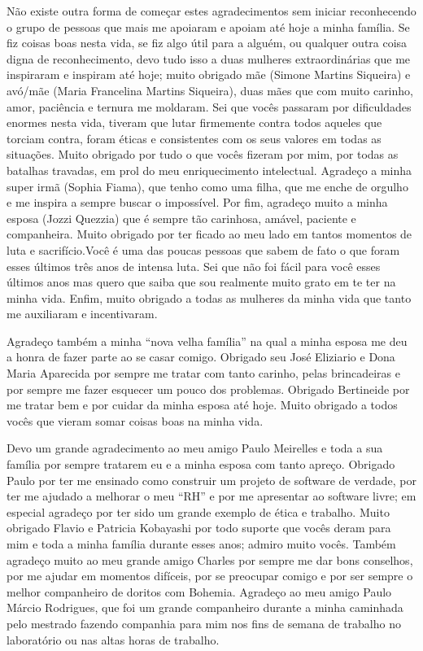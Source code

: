 Não existe outra forma de começar estes agradecimentos sem iniciar reconhecendo
o grupo de pessoas que mais me apoiaram e apoiam até hoje a minha família. Se
fiz coisas boas nesta vida, se fiz algo útil para a alguém, ou qualquer outra
coisa digna de reconhecimento, devo tudo isso a duas mulheres extraordinárias
que me inspiraram e inspiram até hoje; muito obrigado mãe (Simone Martins
Siqueira) e avó/mãe (Maria Francelina Martins Siqueira), duas mães que com
muito carinho, amor, paciência e ternura me moldaram. Sei que vocês passaram
por dificuldades enormes nesta vida, tiveram que lutar firmemente contra todos
aqueles que torciam contra, foram éticas e consistentes com os seus valores em
todas as situações. Muito obrigado por tudo o que vocês fizeram por mim, por
todas as batalhas travadas, em prol do meu enriquecimento intelectual. Agradeço
a minha super irmã (Sophia Fiama), que tenho como uma filha, que me enche de
orgulho e me inspira a sempre buscar o impossível. Por fim, agradeço muito a
minha esposa (Jozzi Quezzia) que é sempre tão carinhosa, amável, paciente e
companheira. Muito obrigado por ter ficado ao meu lado em tantos momentos de
luta e sacrifício.Você é uma das poucas pessoas que sabem de fato o que foram
esses últimos três anos de intensa luta. Sei que não foi fácil para você esses
últimos anos mas quero que saiba que sou realmente muito grato em te ter na
minha vida. Enfim, muito obrigado a todas as mulheres da minha vida que tanto
me auxiliaram e incentivaram.

Agradeço também a minha “nova velha família” na qual a minha esposa me deu a
honra de fazer parte ao se casar comigo. Obrigado seu José Eliziario e Dona
Maria Aparecida por sempre me tratar com tanto carinho, pelas brincadeiras e
por sempre me fazer esquecer um pouco dos problemas. Obrigado Bertineide por me
tratar bem e por cuidar da minha esposa até hoje. Muito obrigado a todos vocês
que vieram somar coisas boas na minha vida.

Devo um grande agradecimento ao meu amigo Paulo Meirelles e toda a sua família
por sempre tratarem eu e a minha esposa com tanto apreço. Obrigado Paulo por
ter me ensinado como construir um projeto de software de verdade, por ter me
ajudado a melhorar o meu “RH” e por me apresentar ao software livre; em
especial agradeço por ter sido um grande exemplo de ética e trabalho. Muito
obrigado Flavio e Patricia Kobayashi por todo suporte que vocês deram para mim
e toda a minha família durante esses anos; admiro muito vocês. Também agradeço
muito ao meu grande amigo Charles por sempre me dar bons conselhos, por me
ajudar em momentos difíceis, por se preocupar comigo e por ser sempre o melhor
companheiro de doritos com Bohemia. Agradeço ao meu amigo Paulo Márcio
Rodrigues, que foi um grande companheiro durante a minha caminhada pelo
mestrado fazendo companhia para mim nos fins de semana de trabalho no
laboratório ou nas altas horas de trabalho.

